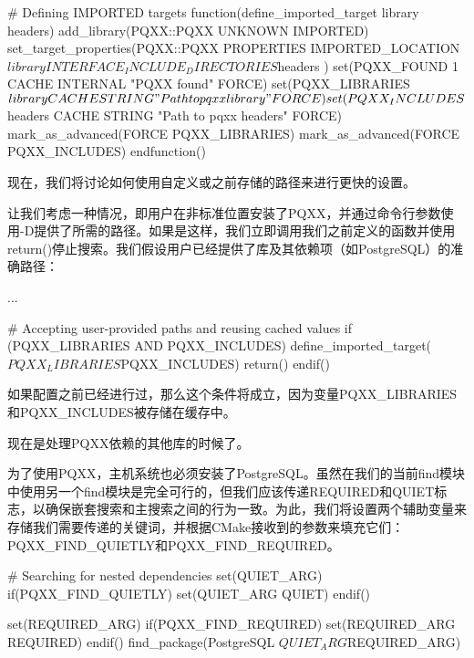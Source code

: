 \begin{cmake}
# Defining IMPORTED targets
function(define_imported_target library headers)
    add_library(PQXX::PQXX UNKNOWN IMPORTED)
    set_target_properties(PQXX::PQXX PROPERTIES
        IMPORTED_LOCATION ${library}
        INTERFACE_INCLUDE_DIRECTORIES ${headers}
    )
    set(PQXX_FOUND 1 CACHE INTERNAL "PQXX found" FORCE)
    set(PQXX_LIBRARIES ${library}
        CACHE STRING "Path to pqxx library" FORCE)
    set(PQXX_INCLUDES ${headers}
        CACHE STRING "Path to pqxx headers" FORCE)
    mark_as_advanced(FORCE PQXX_LIBRARIES)
    mark_as_advanced(FORCE PQXX_INCLUDES)
endfunction()
\end{cmake}

现在，我们将讨论如何使用自定义或之前存储的路径来进行更快的设置。


让我们考虑一种情况，即用户在非标准位置安装了PQXX，并通过命令行参数使用-D提供了所需的路径。如果是这样，我们立即调用我们之前定义的函数并使用return()停止搜索。我们假设用户已经提供了库及其依赖项（如PostgreSQL）的准确路径：


\begin{cmake}
...

# Accepting user-provided paths and reusing cached values
if (PQXX_LIBRARIES AND PQXX_INCLUDES)
    define_imported_target(${PQXX_LIBRARIES} ${PQXX_INCLUDES})
    return()
endif()
\end{cmake}

如果配置之前已经进行过，那么这个条件将成立，因为变量PQXX\_LIBRARIES和PQXX\_INCLUDES被存储在缓存中。

现在是处理PQXX依赖的其他库的时候了。


为了使用PQXX，主机系统也必须安装了PostgreSQL。虽然在我们的当前find模块中使用另一个find模块是完全可行的，但我们应该传递REQUIRED和QUIET标志，以确保嵌套搜索和主搜索之间的行为一致。为此，我们将设置两个辅助变量来存储我们需要传递的关键词，并根据CMake接收到的参数来填充它们：PQXX\_FIND\_QUIETLY和PQXX\_FIND\_REQUIRED。

\begin{cmake}
# Searching for nested dependencies
set(QUIET_ARG)
if(PQXX_FIND_QUIETLY)
    set(QUIET_ARG QUIET)
endif()

set(REQUIRED_ARG)
if(PQXX_FIND_REQUIRED)
    set(REQUIRED_ARG REQUIRED)
endif()
find_package(PostgreSQL ${QUIET_ARG} ${REQUIRED_ARG})
\end{cmake}

